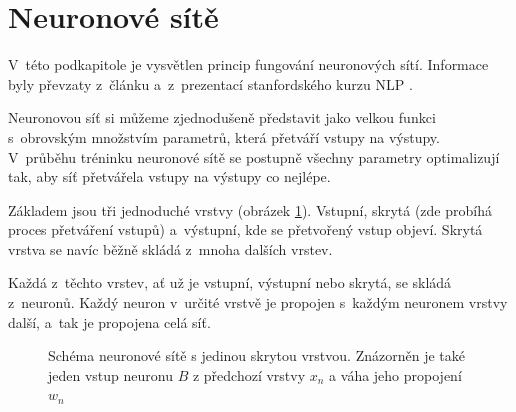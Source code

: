\section{Neuronové sítě}
\label{neuronove_site}
V~této podkapitole je vysvětlen princip fungování neuronových sítí. Informace byly převzaty z~článku \cite{neural_nets} a~z~prezentací stanfordského kurzu NLP \cite{stanford:nlp}.\par
Neuronovou síť si můžeme zjednodušeně představit jako velkou funkci s~obrovským množstvím parametrů, která přetváří vstupy na výstupy. V~průběhu tréninku neuronové sítě se postupně všechny parametry optimalizují tak, aby síť přetvářela vstupy na výstupy co nejlépe.\par
Základem jsou tři jednoduché vrstvy (obrázek \ref{three_layers}). Vstupní, skrytá (zde probíhá proces přetváření vstupů) a~výstupní, kde se přetvořený vstup objeví. Skrytá vrstva se navíc běžně skládá z~mnoha dalších vrstev.\par
Každá z~těchto vrstev, ať už je vstupní, výstupní nebo skrytá, se skládá z~neuronů. Každý neuron v~určité vrstvě je propojen s~každým neuronem vrstvy další, a~tak je propojena celá síť.

\begin{figure}[hbt]
	\centering
	\caption{Schéma neuronové sítě s jedinou skrytou vrstvou. Znázorněn je také jeden vstup neuronu $B$ z předchozí vrstvy $x_n$ a váha jeho propojení $w_n$}
	\label{three_layers}
\end{figure}

